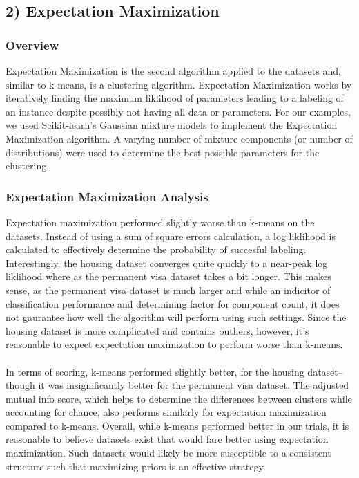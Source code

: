 \documentclass[h]{article}
\begin{document}
\subsection*{2) Expectation Maximization}  
\subsubsection*{Overview}
Expectation Maximization is the second algorithm applied to the datasets and, 
similar to k-means, is a clustering algorithm.  Expectation Maximization works 
by iteratively finding the maximum liklihood of parameters leading to a labeling 
of an instance despite possibly not having all data or parameters.  For our 
examples, we used Scikit-learn's Gaussian mixture models to implement the 
Expectation Maximization algorithm.  A varying number of mixture components (or number of distributions) were 
used to determine the best possible parameters for the clustering.

\subsubsection*{Expectation Maximization Analysis}
Expectation maximization performed slightly worse than k-means on the 
datasets.  Instead of using a sum of square errors calculation, a log liklihood 
is calculated to effectively determine the probability of succesful labeling.  
Interestingly, the housing dataset converges quite quickly to a near-peak log 
liklihood where as the permanent visa dataset takes a bit longer.  This makes 
sense, as the permanent visa dataset is much larger and while an indicitor of 
classification performance and determining factor for component count, it does not gaurantee how well the 
algorithm will perform using such settings.  Since the housing dataset is more 
complicated and contains outliers, however, it's reasonable to expect 
expectation maximization to perform worse than k-means.
\\ \\
In terms of scoring, k-means performed slightly better, for the housing dataset--though it was insignificantly better for the 
permanent visa dataset.  The adjusted mutual info score, which helps to 
determine the differences between clusters while accounting for chance, also 
performs similarly for expectation maximization compared to k-means.  Overall, 
while k-means performed better in our trials, it is reasonable to believe 
datasets exist that would fare better using expectation maximization.  Such 
datasets would likely be more susceptible to a consistent 
structure such that maximizing priors is an effective strategy.
\end{document}
